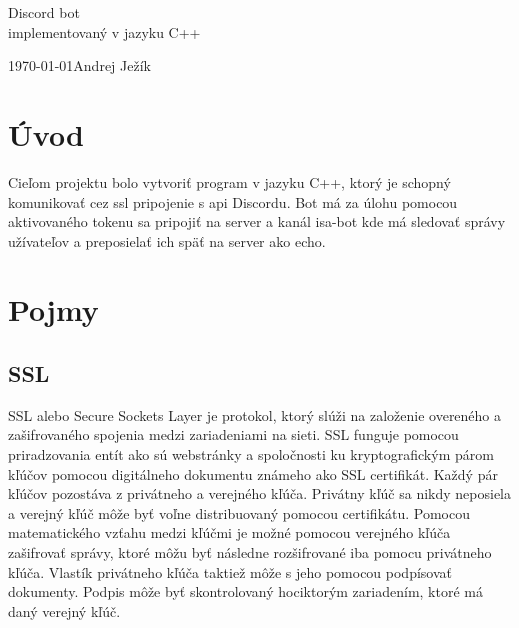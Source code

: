 \documentclass[11pt,a4paper]{article}
\begin{document}

\begin{titlepage}

\begin{center}



	{
	
		\Huge Discord bot\\
		\LARGE implementovaný v jazyku C++\\[0.4em]
	}


\end{center}

	{
		\LARGE \today \hfill Andrej Ježík
	}

\end{titlepage}	

\setlength{\parskip}{0pt}
{\hypersetup{hidelinks}\tableofcontents}
\setlength{\parskip}{0pt}

\newpage %

\section{Úvod}
	\indent Cieľom projektu  bolo vytvoriť program v jazyku C++, ktorý je schopný komunikovať cez ssl 
	pripojenie s api Discordu. Bot má za úlohu pomocou aktivovaného tokenu sa pripojiť na server a kanál 
	isa-bot kde má sledovať správy užívateľov a preposielať ich späť na server ako echo.

\section{Pojmy}

	\subsection{SSL}
		\indent SSL alebo Secure Sockets Layer je protokol, ktorý slúži na založenie 
		overeného a zašifrovaného spojenia medzi zariadeniami na sieti. SSL funguje pomocou 
		priradzovania entít ako sú webstránky a spoločnosti ku kryptografickým párom kľúčov 
		pomocou digitálneho dokumentu známeho ako SSL certifikát. Každý pár kľúčov pozostáva z 
		privátneho a verejného kľúča. Privátny kľúč sa nikdy neposiela a verejný kľúč môže byť 
		voľne distribuovaný pomocou certifikátu. 
		\indent Pomocou matematického vzťahu medzi kľúčmi je možné pomocou verejného kľúča zašifrovať 
		správy, ktoré môžu byť následne rozšifrované iba pomocu privátneho kľúča. Vlastík privátneho kľúča 
		taktiež môže s jeho pomocou podpísovať dokumenty. Podpis môže byť skontrolovaný hociktorým zariadením, 
		ktoré má daný verejný kľúč.
\end{document}
